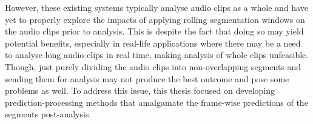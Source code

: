 However, these existing systems typically analyse audio clips as a whole and have yet to properly explore the impacts of applying rolling segmentation windows on the audio clips prior to analysis. This is despite the fact that doing so may yield potential benefits, especially in real-life applications where there may be a need to analyse long audio clips in real time, making analysis of whole clips unfeasible. Though, just purely dividing the audio clips into non-overlapping segments and sending them for analysis may not produce the best outcome and pose some problems as well. To address this issue, this thesis focused on developing prediction-processing methods that amalgamate the frame-wise predictions of the segments post-analysis.\\


